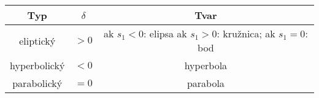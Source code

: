 \begin{tabular}{|c|c|c|}
\hline
\textbf{Typ} & $\delta$ & \textbf{Tvar} \\
\hline
eliptický & $> 0$ & ak $s_1 < 0$: elipsa ak $s_1 > 0$: kružnica; ak $s_1 = 0$: bod \\
\hline
hyperbolický & $< 0$ & hyperbola \\
\hline
parabolický & $= 0$ & parabola \\
\hline
\end{tabular}
